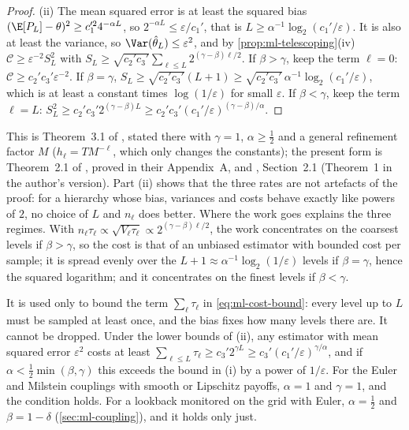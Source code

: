 \begin{proof}
(ii) The mean squared error is at least the squared bias $(\E[P_L]-\theta)^2\ge c_1'^24^{-\alpha L}$,
so $2^{-\alpha L}\le\varepsilon/c_1'$, that is $L\ge\alpha^{-1}\log_2(c_1'/\varepsilon)$. It is
also at least the variance, so $\Var(\hat\theta_L)\le\varepsilon^2$, and by
\cref{prop:ml-telescoping}(iv) $\mathcal C\ge\varepsilon^{-2}S_L^2$ with
$S_L\ge\sqrt{c_2'c_3'}\sum_{\ell\le L}2^{(\gamma-\beta)\ell/2}$. If $\beta>\gamma$, keep the
term $\ell=0$: $\mathcal C\ge c_2'c_3'\varepsilon^{-2}$. If $\beta=\gamma$,
$S_L\ge\sqrt{c_2'c_3'}(L+1)\ge\sqrt{c_2'c_3'}\,\alpha^{-1}\log_2(c_1'/\varepsilon)$, which is at
least a constant times $\log(1/\varepsilon)$ for small $\varepsilon$. If $\beta<\gamma$, keep the
term $\ell=L$: $S_L^2\ge c_2'c_3'2^{(\gamma-\beta)L}\ge c_2'c_3'(c_1'/\varepsilon)^{(\gamma-\beta)/\alpha}$.
\end{proof}

This is Theorem~3.1 of \textcite{giles-mlmc}, stated there with $\gamma=1$, $\alpha\ge\frac12$ and
a general refinement factor $M$ ($h_\ell=TM^{-\ell}$, which only changes the constants); the
present form is Theorem~2.1 of \textcite{cliffe-giles-scheichl-teckentrup}, proved in their
Appendix~A, and \textcite{giles-acta}, Section~2.1 (Theorem~1 in the author's version). Part (ii) shows that the three rates are not artefacts of the
proof: for a hierarchy whose bias, variances and costs behave exactly like powers of $2$, no
choice of $L$ and $n_\ell$ does better. Where the work goes explains the three regimes. With
$n_\ell\tau_\ell\propto\sqrt{V_\ell\tau_\ell}\propto2^{(\gamma-\beta)\ell/2}$, the work
concentrates on the coarsest levels if $\beta>\gamma$, so the cost is that of an unbiased
estimator with bounded cost per sample; it is spread evenly over the $L+1\approx\alpha^{-1}\log_2(1/\varepsilon)$
levels if $\beta=\gamma$, hence the squared logarithm; and it concentrates on the finest levels if
$\beta<\gamma$.

\begin{remark}\label{rem:ml-alpha}
It is used only to bound the term $\sum_\ell\tau_\ell$ in \eqref{eq:ml-cost-bound}: every level up
to $L$ must be sampled at least once, and the bias fixes how many levels there are. It cannot be
dropped. Under the lower bounds of (ii), any estimator with mean squared error $\varepsilon^2$
costs at least $\sum_{\ell\le L}\tau_\ell\ge c_3'2^{\gamma L}\ge c_3'(c_1'/\varepsilon)^{\gamma/\alpha}$,
and if $\alpha<\frac12\min(\beta,\gamma)$ this exceeds the bound in (i) by a power of
$1/\varepsilon$. For the Euler and Milstein couplings with smooth or Lipschitz payoffs,
$\alpha=1$ and $\gamma=1$, and the condition holds. For a lookback monitored on the grid with
Euler, $\alpha=\frac12$ and $\beta=1-\delta$ (\cref{sec:ml-coupling}), and it holds only just.
\end{remark}

